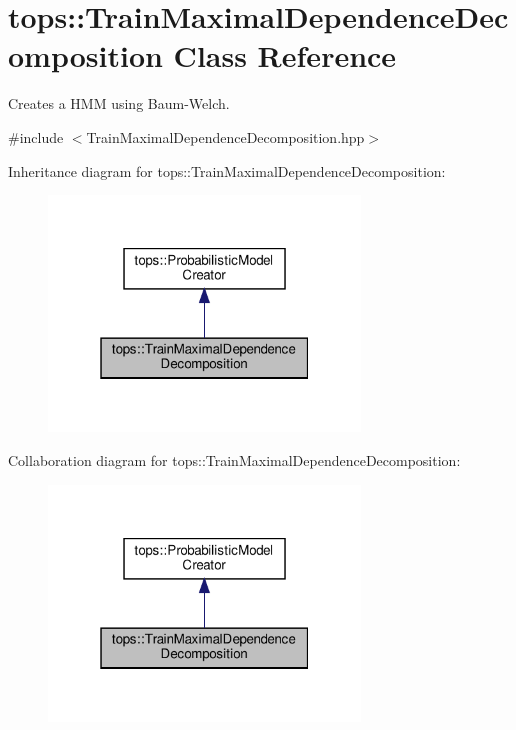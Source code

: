\hypertarget{classtops_1_1TrainMaximalDependenceDecomposition}{}\section{tops\+:\+:Train\+Maximal\+Dependence\+Decomposition Class Reference}
\label{classtops_1_1TrainMaximalDependenceDecomposition}


Creates a H\+MM using Baum-\/\+Welch.  




{\ttfamily \#include $<$Train\+Maximal\+Dependence\+Decomposition.\+hpp$>$}



Inheritance diagram for tops\+:\+:Train\+Maximal\+Dependence\+Decomposition\+:
\nopagebreak
\begin{figure}[H]
\begin{center}
\leavevmode
\includegraphics[width=235pt]{classtops_1_1TrainMaximalDependenceDecomposition__inherit__graph}
\end{center}
\end{figure}


Collaboration diagram for tops\+:\+:Train\+Maximal\+Dependence\+Decomposition\+:
\nopagebreak
\begin{figure}[H]
\begin{center}
\leavevmode
\includegraphics[width=235pt]{classtops_1_1TrainMaximalDependenceDecomposition__coll__graph}
\end{center}
\end{figure}

